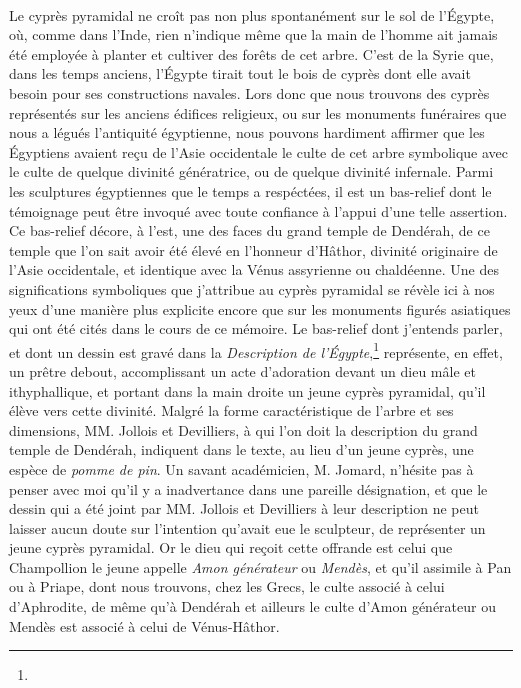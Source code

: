 \documentclass[a4paper, 11pt, oneside, polutonikogreek, french]{article}
\begin{document}
\paragraph{}
Le cyprès pyramidal ne croît pas non plus spontanément sur le sol de l'Égypte, où, comme dans l'Inde, rien n'indique même que la main de l'homme ait jamais été employée à planter et cultiver des forêts de cet arbre. C'est de la Syrie que, dans les temps anciens, l'Égypte tirait tout le bois de cyprès dont elle avait besoin pour ses constructions navales. Lors donc que nous trouvons des cyprès représentés sur les anciens édifices religieux, ou sur les monuments funéraires que nous a légués l'antiquité égyptienne, nous pouvons hardiment affirmer que les Égyptiens avaient reçu de l'Asie occidentale le culte de cet arbre symbolique avec le culte de quelque divinité génératrice, ou de quelque divinité infernale. Parmi les sculptures égyptiennes que le temps a respéctées, il est un bas-relief dont le témoignage peut être invoqué avec toute confiance à l'appui d'une telle assertion. Ce bas-relief décore, à l'est, une des faces du grand temple de Dendérah, de ce temple que l'on sait avoir été élevé en l'honneur d'Hâthor, divinité originaire de l'Asie occidentale, et identique avec la Vénus assyrienne ou chaldéenne. Une des significations symboliques que j'attribue au cyprès pyramidal se révèle ici à nos yeux d'une manière plus explicite encore que sur les monuments figurés asiatiques qui ont été cités dans le cours de ce mémoire. Le bas-relief dont j'entends parler, et dont un dessin est gravé dans la \emph{Description de l'Égypte},\footnote{} représente, en effet, un prêtre debout, accomplissant un acte d'adoration devant un dieu mâle et ithyphallique, et portant dans la main droite un jeune cyprès pyramidal, qu'il élève vers cette divinité. Malgré la forme caractéristique de l'arbre et ses dimensions, MM. Jollois et Devilliers, à qui l'on doit la description du grand temple de Dendérah, indiquent dans le texte, au lieu d'un jeune cyprès, une espèce de \emph{pomme de pin}. Un savant académicien, M. Jomard, n'hésite pas à penser avec moi qu'il y a inadvertance dans une pareille désignation, et que le dessin qui a été joint par MM. Jollois et Devilliers à leur description ne peut laisser aucun doute sur l'intention qu'avait eue le sculpteur, de représenter un jeune cyprès pyramidal. Or le dieu qui reçoit cette offrande est celui que Champollion le jeune appelle \emph{Amon générateur} ou \emph{Mendès}, et qu'il assimile à Pan ou à Priape, dont nous trouvons, chez les Grecs, le culte associé à celui d'Aphrodite, de même qu'à Dendérah et ailleurs le culte d'Amon générateur ou Mendès est associé à celui de Vénus-Hâthor.
\end{document}
